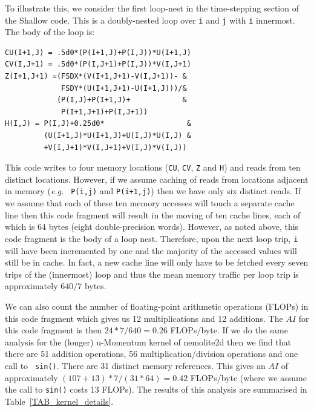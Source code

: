 \documentclass[12pt]{article}
\begin{document}
To illustrate this, we consider the first loop-nest in the
time-stepping section of the Shallow code. This is a doubly-nested
loop over {\tt i} and {\tt j} with {\tt i} innermost. The body of the
loop is:
\begin{verbatim}
CU(I+1,J) = .5d0*(P(I+1,J)+P(I,J))*U(I+1,J)
CV(I,J+1) = .5d0*(P(I,J+1)+P(I,J))*V(I,J+1)
Z(I+1,J+1) =(FSDX*(V(I+1,J+1)-V(I,J+1))- &
             FSDY*(U(I+1,J+1)-U(I+1,J)))/&
            (P(I,J)+P(I+1,J)+            &
             P(I+1,J+1)+P(I,J+1))
H(I,J) = P(I,J)+0.25d0*                   &
         (U(I+1,J)*U(I+1,J)+U(I,J)*U(I,J) & 
         +V(I,J+1)*V(I,J+1)+V(I,J)*V(I,J))
\end{verbatim}
This code writes to four memory locations ({\tt CU}, {\tt CV}, {\tt Z}
and {\tt H}) and reads from ten distinct locations.  However, if we
assume caching of reads from locations adjacent in memory ({\it e.g.} {\tt
  P(i,j)} and {\tt P(i+1,j)}) then we have only six distinct reads.
If we assume that each of these ten memory accesses will touch a
separate cache line then this code fragment will result in the moving
of ten cache lines, each of which is 64 bytes (eight double-precision
words). However, as noted above, this code fragment is the body of a
loop nest. Therefore, upon the next loop trip, {\tt i} will have been
incremented by one and the majority of the accessed values will still
be in cache. In fact, a new cache line will only have to be fetched
every seven trips of the (innermost) loop and thus the mean memory
traffic per loop trip is approximately $640/7$ bytes.

We can also count the number of floating-point arithmetic operations
(FLOPs) in this code fragment which gives us 12 multiplications and 12
additions. The $AI$ for this code fragment is then $24*7/640 = 0.26$
FLOPs/byte.  If we do the same analysis for the (longer) u-Momentum
kernel of nemolite2d then we find that there are 51 addition
operations, 56 multiplication/division operations and one call to {\tt
  sin()}. There are 31 distinct memory references. This gives an $AI$
of approximately $(107+13)*7/(31*64) = 0.42$ FLOPs/byte (where we
assume the call to {\tt sin()} costs 13 FLOPs). The results of this
analysis are summarised in Table~\ref{TAB_kernel_details}.
\end{document}
